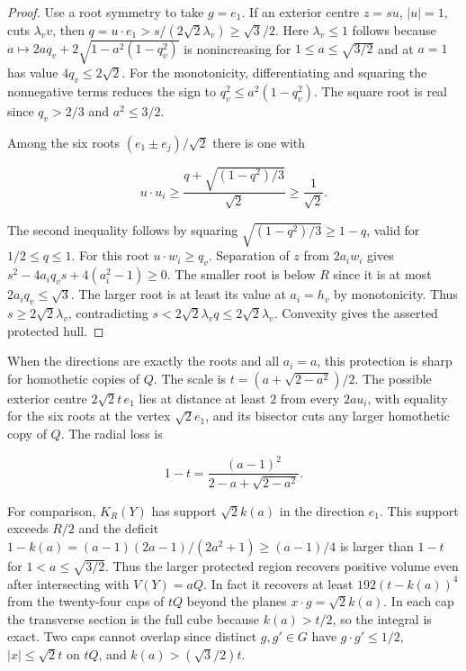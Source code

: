 \begin{proof}
Use a root symmetry to take $g=e_1$. If an exterior centre $z=su$, $|u|=1$, cuts
$\lambda_v v$, then $q=u\cdot e_1>s/(2\sqrt2\lambda_v)\ge\sqrt3/2$. Here $\lambda_v\le1$
follows because $a\mapsto 2aq_v+2\sqrt{1-a^2(1-q_v^2)}$ is nonincreasing for $1\le
a\le\sqrt{3/2}$ and at $a=1$ has value $4q_v\le2\sqrt2$. For the monotonicity,
differentiating and squaring the nonnegative terms reduces the sign to $q_v^2\le
a^2(1-q_v^2)$. The square root is real since $q_v>2/3$ and $a^2\le3/2$.

Among the six roots $(e_1\pm e_j)/\sqrt2$ there is one with

\[
u\cdot u_i\ge \frac{q+\sqrt{(1-q^2)/3}}{\sqrt2}\ge\frac1{\sqrt2}.
\]

The second inequality follows by squaring $\sqrt{(1-q^2)/3}\ge1-q$, valid for $1/2\le
q\le1$. For this root $u\cdot w_i\ge q_v$. Separation of $z$ from $2a_iw_i$ gives
$s^2-4a_iq_vs+4(a_i^2-1)\ge0$. The smaller root is below $R$ since it is at most
$2a_iq_v\le\sqrt3$. The larger root is at least its value at $a_i=h_v$ by monotonicity.
Thus $s\ge2\sqrt2\lambda_v$, contradicting $s<2\sqrt2\lambda_v q\le2\sqrt2\lambda_v$.
Convexity gives the asserted protected hull.
\end{proof}

\begin{remark}
When the directions are exactly the roots and all $a_i=a$, this protection is sharp for
homothetic copies of $Q$. The scale is $t=(a+\sqrt{2-a^2})/2$. The possible exterior
centre $2\sqrt2t\,e_1$ lies at distance at least $2$ from every $2au_i$, with equality for
the six roots at the vertex $\sqrt2e_1$, and its bisector cuts any larger homothetic copy
of $Q$. The radial loss is

\[
1-t=\frac{(a-1)^2}{2-a+\sqrt{2-a^2}}.
\]

For comparison, $K_R(Y)$ has support $\sqrt2k(a)$ in the direction $e_1$. This support
exceeds $R/2$ and the deficit $1-k(a)=(a-1)(2a-1)/(2a^2+1)\ge(a-1)/4$ is larger than $1-t$
for $1<a\le\sqrt{3/2}$. Thus the larger protected region recovers positive volume even
after intersecting with $V(Y)=aQ$. In fact it recovers at least $192(t-k(a))^4$ from the
twenty-four caps of $tQ$ beyond the planes $x\cdot g=\sqrt2k(a)$. In each cap the
transverse section is the full cube because $k(a)>t/2$, so the integral is exact. Two caps
cannot overlap since distinct $g,g'\in G$ have $g\cdot g'\le1/2$, $|x|\le\sqrt2t$ on $tQ$,
and $k(a)>(\sqrt3/2)t$.
\end{remark}

